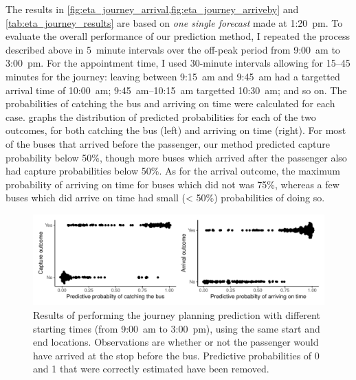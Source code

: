 The results in \cref{fig:eta_journey_arrival,fig:eta_journey_arriveby} and \cref{tab:eta_journey_results} are based on \emph{one single forecast} made at  1:20~pm. To evaluate the overall performance of our prediction method, I repeated the process described above in 5~minute intervals over the off-peak period from  9:00~am to  3:00~pm. For the appointment time, I used 30-minute intervals allowing for 15--45 minutes for the journey: leaving between 9:15~am and 9:45~am had a targetted arrival time of 10:00~am; 9:45~am--10:15~am targetted 10:30~am; and so on. The probabilities of catching the bus and arriving on time were calculated for each case.  graphs the distribution of predicted probabilities for each of the two outcomes, for both catching the bus (left) and arriving on time (right). For most of the buses that arrived before the passenger, our method predicted capture probability below 50\%, though more buses which arrived after the passenger also had capture probabilities below 50\%. As for the arrival outcome, the maximum probability of arriving on time for buses which did not was 75\%, whereas a few buses which did arrive on time had small (< 50\%) probabilities of doing so.


\begin{knitrout}\small
{}\color{fgcolor}\begin{figure}

{\centering \includegraphics[width=\textwidth]{figure/eta_journey_results_avg-1} 

}

\caption[Results of performing the journey planning prediction with different starting times]{Results of performing the journey planning prediction with different starting times (from  9:00~am to  3:00~pm), using the same start and end locations. Observations are whether or not the passenger would have arrived at the stop before the bus. Predictive probabilities of 0 and 1 that were correctly estimated have been removed.}\label{fig:eta_journey_results_avg}
\end{figure}


\end{knitrout}

